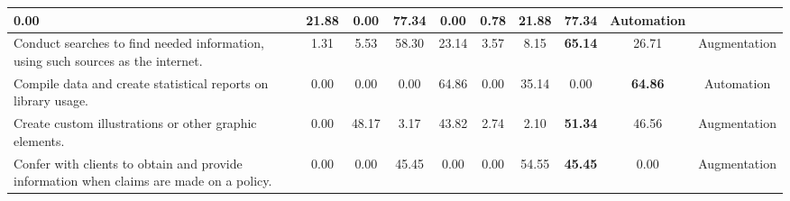 {\begin{tabular}{|p{9.5cm}|cccccc|cc|c|}
0.00 & 21.88 & 0.00 & 77.34 & 0.00 & 0.78 & 21.88 & \textbf{77.34} & Automation \\
\hline
\raggedright Conduct searches to find needed information, using such sources as the internet. &
1.31 & 5.53 & 58.30 & 23.14 & 3.57 & 8.15 & \textbf{65.14} & 26.71 & Augmentation \\
\hline
\raggedright Compile data and create statistical reports on library usage. &
0.00 & 0.00 & 0.00 & 64.86 & 0.00 & 35.14 & 0.00 & \textbf{64.86} & Automation \\
\hline
\raggedright Create custom illustrations or other graphic elements. &
0.00 & 48.17 & 3.17 & 43.82 & 2.74 & 2.10 & \textbf{51.34} & 46.56 & Augmentation \\
\hline
\raggedright Confer with clients to obtain and provide information when claims are made on a policy. &
0.00 & 0.00 & 45.45 & 0.00 & 0.00 & 54.55 & \textbf{45.45} & 0.00 & Augmentation \\
\hline
\end{tabular}
}